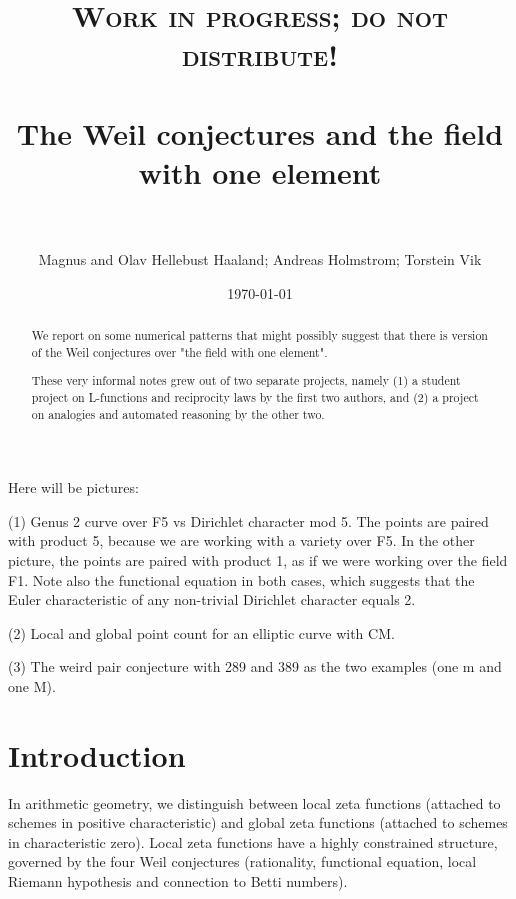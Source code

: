 \documentclass[paper=a4, fontsize=11pt]{scrartcl} %
\title{
\normalfont \normalsize
\textsc{Work in progress; do not distribute!} \\ [25pt] %
\horrule{0.5pt} \\[0.4cm] %
\LARGE The Weil conjectures and the field with one element \\ %
\horrule{2pt} \\[0.5cm] %
}
\author{Magnus and Olav Hellebust Haaland; Andreas Holmstrom; Torstein Vik} %
\date{\normalsize\today} %
\numberwithin{equation}{section} %
\numberwithin{figure}{section} %
\numberwithin{table}{section} %
\begin{document}
\maketitle %


\begin{abstract}

We report on some numerical patterns that might possibly suggest that there is version of the Weil conjectures over "the field with one element".

These very informal notes grew out of two separate projects, namely (1) a student project on L-functions and reciprocity laws by the first two authors, and (2) a project on analogies and automated reasoning by the other two.



\end{abstract}


\newpage

Here will be pictures:

(1) Genus 2 curve over F5 vs Dirichlet character mod 5. The points are paired with product 5, because we are working with a variety over F5. In the other picture, the points are paired with product 1, as if we were working over the field F1. Note also the functional equation in both cases, which suggests that the Euler characteristic of any non-trivial Dirichlet character equals 2.

(2) Local and global point count for an elliptic curve with CM.

(3) The weird pair conjecture with 289 and 389 as the two examples (one m and one M).


\newpage

\tableofcontents


\newpage

\section{Introduction}

In arithmetic geometry, we distinguish between local zeta functions (attached to schemes in positive characteristic) and global zeta functions (attached to schemes in characteristic zero). Local zeta functions have a highly constrained structure, governed by the four Weil conjectures (rationality, functional equation, local Riemann hypothesis and connection to Betti numbers).
\end{document}
